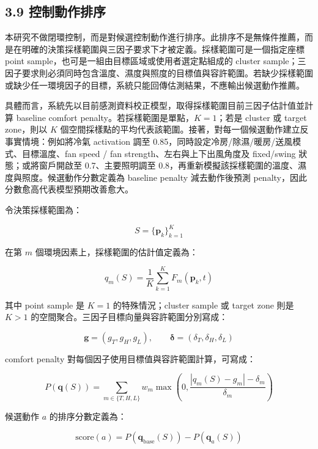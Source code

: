 \documentclass[12pt,a4paper]{article}
\begin{document}
\subsection*{3.9 控制動作排序}

本研究不做閉環控制，而是對候選控制動作進行排序。此排序不是無條件推薦，而是在明確的決策採樣範圍與三因子要求下才被定義。採樣範圍可是一個指定座標 point sample，也可是一組由目標區域或使用者選定點組成的 cluster sample；三因子要求則必須同時包含溫度、濕度與照度的目標值與容許範圍。若缺少採樣範圍或缺少任一環境因子的目標，系統只能回傳估測結果，不應輸出候選動作推薦。


具體而言，系統先以目前感測資料校正模型，取得採樣範圍目前三因子估計值並計算 baseline comfort penalty。若採樣範圍是單點，$K=1$；若是 cluster 或 target zone，則以 $K$ 個空間採樣點的平均代表該範圍。接著，對每一個候選動作建立反事實情境：例如將冷氣 activation 調至 0.85，同時設定冷房/除濕/暖房/送風模式、目標溫度、fan speed / fan strength、左右與上下出風角度及 fixed/swing 狀態；或將窗戶開啟至 0.7、主要照明調至 0.8，再重新模擬該採樣範圍的溫度、濕度與照度。候選動作分數定義為 baseline penalty 減去動作後預測 penalty，因此分數愈高代表模型預期改善愈大。


令決策採樣範圍為：


\[
S=\{\mathbf{p}_k\}_{k=1}^{K}
\]

在第 $m$ 個環境因素上，採樣範圍的估計值定義為：


\[
q_m(S)=\frac{1}{K}\sum_{k=1}^{K}F_m(\mathbf{p}_k,t)
\]

其中 point sample 是 $K=1$ 的特殊情況；cluster sample 或 target zone 則是 $K>1$ 的空間聚合。三因子目標向量與容許範圍分別寫成：


\[
\mathbf{g}=(g_T,g_H,g_L),\qquad \boldsymbol{\delta}=(\delta_T,\delta_H,\delta_L)
\]

comfort penalty 對每個因子使用目標值與容許範圍計算，可寫成：


\[
P(\mathbf{q}(S))=\sum_{m\in\{T,H,L\}} w_m \max\left(0,\frac{|q_m(S)-g_m|-\delta_m}{\delta_m}\right)
\]

候選動作 $a$ 的排序分數定義為：


\[
\mathrm{score}(a)=P(\mathbf{q}_{\mathrm{base}}(S))-P(\mathbf{q}_{a}(S))
\]
\end{document}
